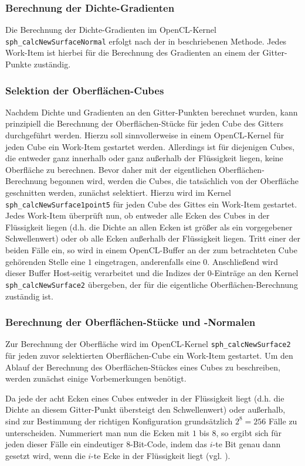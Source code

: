 \subsubsection*{Berechnung der Dichte-Gradienten}
Die Berechnung der Dichte-Gradienten im OpenCL-Kernel {\tt sph\_calcNewSurfaceNormal} erfolgt nach der in \cite[S. 165]{MC} beschriebenen Methode. Jedes Work-Item ist hierbei für die Berechnung des Gradienten an einem der Gitter-Punkte zuständig.
\medskip

\subsubsection*{Selektion der Oberflächen-Cubes}
Nachdem Dichte und Gradienten an den Gitter-Punkten berechnet wurden, kann prinzipiell die Berechnung der Oberflächen-Stücke für jeden Cube des Gitters durchgeführt werden. Hierzu soll sinnvollerweise in einem OpenCL-Kernel für jeden Cube ein Work-Item gestartet werden. Allerdings ist für diejenigen Cubes, die entweder ganz innerhalb oder ganz außerhalb der Flüssigkeit liegen, keine Oberfläche zu berechnen. Bevor daher mit der eigentlichen Oberflächen-Berechnung begonnen wird, werden die Cubes, die tatsächlich von der Oberfläche geschnitten werden, zunächst selektiert. Hierzu wird im Kernel {\tt sph\_calcNewSurface1point5} für jeden Cube des Gittes ein Work-Item gestartet. Jedes Work-Item überprüft nun, ob entweder alle Ecken des Cubes in der Flüssigkeit liegen (d.h. die Dichte an allen Ecken ist größer als ein vorgegebener Schwellenwert) oder ob alle Ecken außerhalb der Flüssigkeit liegen. Tritt einer der beiden Fälle ein, so wird in einem OpenCL-Buffer an der zum betrachteten Cube gehörenden Stelle eine $1$ eingetragen, anderenfalls eine $0$. Anschließend wird dieser Buffer Host-seitig verarbeitet und die Indizes der $0$-Einträge an den Kernel {\tt sph\_calcNewSurface2} übergeben, der für die eigentliche Oberflächen-Berechnung zuständig ist.
\medskip

\subsubsection*{Berechnung der Oberflächen-Stücke und -Normalen}
Zur Berechnung der Oberfläche wird im OpenCL-Kernel {\tt sph\_calcNewSurface2} für jeden zuvor selektierten Oberflächen-Cube ein Work-Item gestartet. Um den Ablauf der Berechnung des Oberflächen-Stückes eines Cubes zu beschreiben, werden zunächst einige Vorbemerkungen benötigt.
\smallskip

\noindent Da jede der acht Ecken eines Cubes entweder in der Flüssigkeit liegt (d.h. die Dichte an diesem Gitter-Punkt übersteigt den Schwellenwert) oder außerhalb, sind zur Bestimmung der richtigen Konfiguration grundsätzlich $2^8 = 256$ Fälle zu unterscheiden. Nummeriert man nun die Ecken mit $1$ bis $8$, so ergibt sich für jeden dieser Fälle ein eindeutiger $8$-Bit-Code, indem das $i$-te Bit genau dann gesetzt wird, wenn die $i$-te Ecke in der Flüssigkeit liegt (vgl. \cite[S. 165]{MC}).
\smallskip

